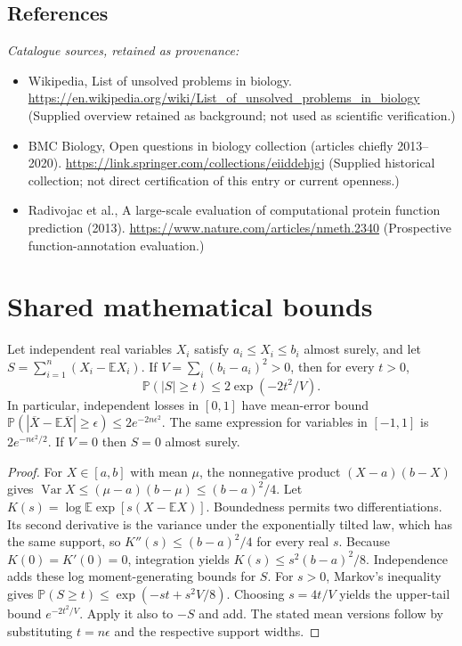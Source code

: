 \documentclass[11pt]{article}
\begin{document}
\subsection{References}
\noindent\emph{Catalogue sources, retained as provenance:}
\begin{itemize}
\item Wikipedia, List of unsolved problems in biology. \url{https://en.wikipedia.org/wiki/List_of_unsolved_problems_in_biology} (Supplied overview retained as background; not used as scientific verification.)
\item BMC Biology, Open questions in biology collection (articles chiefly 2013--2020). \url{https://link.springer.com/collections/eiiddehjgj} (Supplied historical collection; not direct certification of this entry or current openness.)
\item Radivojac et al., A large-scale evaluation of computational protein function prediction (2013). \url{https://www.nature.com/articles/nmeth.2340} (Prospective function-annotation evaluation.)
\end{itemize}




\section{Shared mathematical bounds}\label{app:bounds}
\begin{lemma}\label{lem:bounded}
Let independent real variables $X_i$ satisfy $a_i\leq X_i\leq b_i$ almost surely,
and let $S=\sum_{i=1}^n(X_i-\mathbb{E} X_i)$. If
$V=\sum_i(b_i-a_i)^2>0$, then for every $t>0$,
\[
 \mathbb{P}(|S|\geq t)\leq 2\exp(-2t^2/V).
\]
In particular, independent losses in $[0,1]$ have mean-error bound
$\mathbb{P}(|\overline X-\mathbb{E}\overline X|\geq\epsilon)
\leq2e^{-2n\epsilon^2}$. The same expression for variables in $[-1,1]$
is $2e^{-n\epsilon^2/2}$. If $V=0$ then $S=0$ almost surely.
\end{lemma}
\begin{proof}
For $X\in[a,b]$ with mean $\mu$, the nonnegative product
$(X-a)(b-X)$ gives
$\operatorname{Var} X\leq(\mu-a)(b-\mu)\leq(b-a)^2/4$.
Let $K(s)=\log\mathbb{E}\exp[s(X-\mathbb{E} X)]$.
Boundedness permits two differentiations. Its second derivative is the variance
under the exponentially tilted law, which has the same support, so
$K''(s)\leq(b-a)^2/4$ for every real $s$.
Because $K(0)=K'(0)=0$, integration yields
$K(s)\leq s^2(b-a)^2/8$.
Independence adds these log moment-generating bounds for $S$.
For $s>0$, Markov's inequality gives
$\mathbb{P}(S\geq t)\leq\exp(-st+s^2V/8)$.
Choosing $s=4t/V$ yields the upper-tail bound $e^{-2t^2/V}$.
Apply it also to $-S$ and add. The stated mean versions follow by substituting
$t=n\epsilon$ and the respective support widths.
\end{proof}
\end{document}
